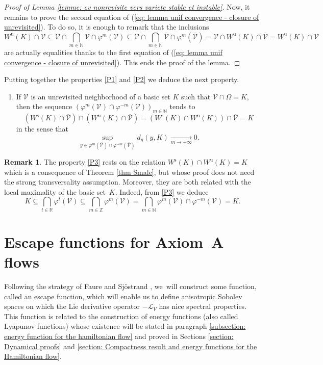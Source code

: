 \documentclass[JEP,XML,SOM,Unicode,NoEqCountersInSection,NoFloatCountersInSection,published]{cedram}
\newcommand{\rs}{\mathrm{s}}
\newcommand{\ru}{\mathrm{u}}
\theoremstyle{definition}
\newtheorem{remark}[definition]{Remark}
\theoremstyle{plain}
\newcommand{\Lie}{\mathcal{L}}
\newcommand{\N}{\mathbb{N}}
\newcommand{\R}{\mathbb{R}}
\newcommand{\Vcal}{\mathcal{V}}
\newcommand{\Z}{\mathbb{Z}}
\begin{document}
\begin{proof}[Proof of Lemma \ref{lemme: cv nonrevisite vers variete stable et instable}]
Now, it remains to prove the second equation of (\ref{eq: lemma unif convergence - closure of unrevisited}). To do so, it is enough to remark that the inclusions
\[
W^\ru (K) \cap \Vcal \subseteq \Vcal \cap \bigcap_{m \in \N} \Vcal \cap \varphi^m (\Vcal) \subseteq \Vcal \cap \bigcap_{m \in \N} \overline{\Vcal} \cap \varphi^m (\overline{\Vcal}) =\Vcal \cap W^\ru (K) \cap \overline{\Vcal} = W^\ru (K) \cap \Vcal
\]
are actually equalities thanks to the first equation of (\ref{eq: lemma unif convergence - closure of unrevisited}). This ends the proof of the lemma.
\end{proof}

Putting together the properties \eqref{P1} and \eqref{P2} we deduce the next property.

\begin{enumerate}\renewcommand{\theenumi}{{P\arabic{enumi}}}\setcounter{enumi}{2}
\item\label{P3}
If $\Vcal$ is an unrevisited neighborhood of a basic set $K$ such that $\overline{\Vcal} \cap \Omega = K$, then the sequence $(\varphi^m (\Vcal) \cap \varphi^{-m} (\Vcal))_{m \in \N}$ tends to
\[
\left(W^\rs (K) \cap \overline{\Vcal} \right) \cap \left(W^\ru (K) \cap \overline{\Vcal} \right) = (W^\rs (K) \cap W^\ru (K))\cap \overline{\Vcal} = K
\]
in the sense that
\[
\sup_{y \in \varphi^m(\overline{\Vcal}) \cap \varphi^{-m} (\overline{\Vcal})} d_g \left(y, K \right) \underset{m \to + \infty}{\to} 0.
\]
\end{enumerate}

\begin{remark} The property \eqref{P3} rests on the relation $W^\rs (K) \cap W^\ru (K) = K$ which is a consequence of Theorem \ref{thm Smale}, but whose proof does not need the strong transversality assumption. Moreover, they are both related with the local maximality of the basic set~$K$. Indeed, from \eqref{P3} we deduce
\[
K \subseteq \bigcap_{t \in \R} \varphi^t (\Vcal) \subseteq \bigcap_{m \in \Z} \varphi^m (\Vcal) = \bigcap_{m \in \N} \varphi^m (\Vcal) \cap \varphi^{-m} (\Vcal) = K.
\]
\end{remark}

\section{Escape functions for Axiom~A flows}\label{section Escape function}

Following the strategy of Faure and Sjöstrand \cite{FS}, we~will construct some function, called an escape function, which will enable us to define anisotropic Sobolev spaces on which the Lie derivative operator $-\Lie_V$ has nice spectral properties. This function is related to the construction of energy functions (also called Lyapunov functions) whose existence will be stated in paragraph \ref{subsection: energy function for the hamiltonian flow} and proved in Sections \ref{section: Dynamical proofs} and \ref{section: Compactness result and energy functions for the Hamiltonian flow}.
\end{document}
